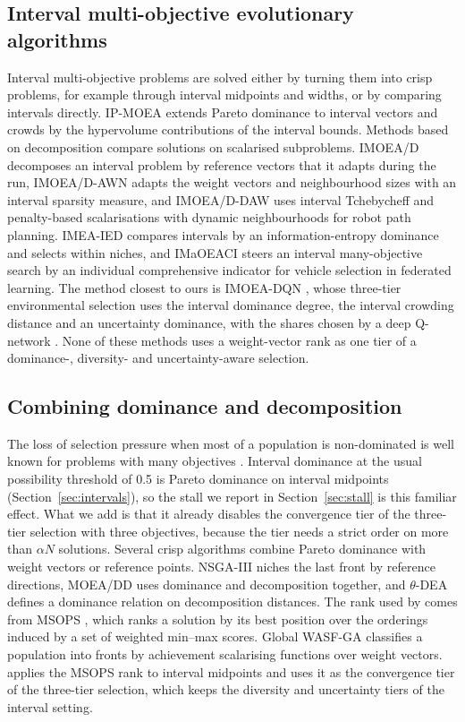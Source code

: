 \subsection{Interval multi-objective evolutionary algorithms}
Interval multi-objective problems are solved either by turning them into crisp problems, for example through interval
midpoints and widths, or by comparing intervals directly. IP-MOEA \citep{limbourg2005ipmoea} extends Pareto dominance to
interval vectors and crowds by the hypervolume contributions of the interval bounds. Methods based on decomposition
compare solutions on scalarised subproblems. IMOEA/D \citep{gan2023imoead} decomposes an interval problem by reference
vectors that it adapts during the run, IMOEA/D-AWN \citep{jin2023imoeadawn} adapts
the weight vectors and neighbourhood sizes with an interval sparsity measure, and IMOEA/D-DAW \citep{zhang2026imoeaddaw}
uses interval Tchebycheff and penalty-based scalarisations with dynamic neighbourhoods for robot path planning.
IMEA-IED \citep{cui2024imeaied} compares intervals by an information-entropy dominance and selects within niches, and
IMaOEACI \citep{cai2025imaoeaci} steers an interval many-objective search by an individual comprehensive indicator for
vehicle selection in federated learning. The method closest to ours is IMOEA-DQN \citep{jin2026imoeadqn}, whose
three-tier environmental selection uses the interval dominance degree, the interval crowding distance and an
uncertainty dominance, with the shares chosen by a deep Q-network \citep{mnih2015dqn}. None of these methods uses a
weight-vector rank as one tier of a dominance-, diversity- and uncertainty-aware selection.

\subsection{Combining dominance and decomposition}
The loss of selection pressure when most of a population is non-dominated is well known for problems with many
objectives \citep{ishibuchi2008review}. Interval dominance at the usual possibility threshold of 0.5 is Pareto dominance
on interval midpoints (Section~\ref{sec:intervals}), so the stall we report in Section~\ref{sec:stall} is this familiar
effect. What we add is that it already disables the convergence tier of the three-tier selection with three
objectives, because the tier needs a strict order on more than $\alpha N$ solutions. Several crisp algorithms combine
Pareto dominance with weight vectors or reference points. NSGA-III \citep{deb2014nsga3} niches the last front by
reference directions, MOEA/DD \citep{li2015moeadd} uses dominance and decomposition together, and $\theta$-DEA
\citep{yuan2016thetadea} defines a dominance relation on decomposition distances. The rank used by \ours{} comes from
MSOPS \citep{hughes2003msops}, which ranks a solution by its best position over the orderings induced by a set of
weighted min--max scores. Global WASF-GA \citep{saborido2017gwasfga} classifies a population into fronts by achievement
scalarising functions over weight vectors. \ours{} applies the MSOPS rank to interval midpoints and uses it as the
convergence tier of the three-tier selection, which keeps the diversity and uncertainty tiers of the interval setting.

